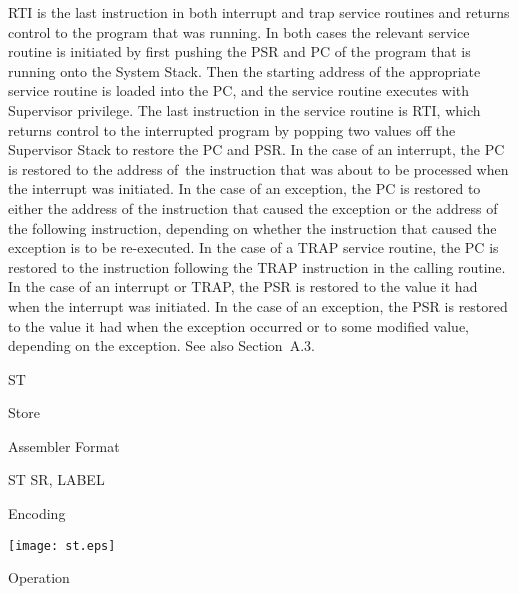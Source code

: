 \documentclass{patt}
\makeatletter
\renewcommand{\apphead}[2]{%
  \clearpage\vspace*{-8pt}
  \noindent\parbox[t]{21pc}{\raggedright\sans\fontsize{24}{28}\fontseries{bk}%
    \selectfont\MakeUppercase{#1}}\parbox[t]{7pc}{\sans\fontseries{bk}\fontsize{14}{28}\selectfont
    \raggedright #2}\@afterindentfalse\@afterheading\vspace*{-1pc}}
\renewcommand{\appbhead}[1]{%
  \goodbreak\vspace{6pt}
  \begingroup
  \noindent\raggedright{\sans\fontsize{12}{14}\fontseries{bk}\selectfont
  #1\par}\endgroup\medskip\@afterindentfalse\@afterheading}
\makeatother
\begin{document}
RTI is the last instruction in both interrupt and trap service 
routines and returns control to the program that was running.
In both cases the relevant service routine is initiated by first pushing
the PSR and PC of the program that is running onto the System Stack. Then
the starting address of the appropriate service routine is loaded into the
PC, and the service routine executes with Supervisor privilege. The last 
instruction in the service 
routine is RTI, which returns control to the interrupted program by 
popping two values off the Supervisor Stack to restore the PC and PSR. 
In the case of an interrupt, the PC is restored to the address of~the 
instruction that was about to be processed when the interrupt was initiated. 
In the case of an exception, the PC is restored to either the address of the
instruction that caused the exception or the address of the following
instruction, depending on whether the instruction that caused the
exception is to be re-executed. In the case of a TRAP service routine,
the PC is restored to the instruction following the TRAP instruction in
the calling routine.  In the case of an interrupt or TRAP, the PSR
is restored to the value it had when the interrupt was initiated. In
the case of an exception, the PSR is restored to the value it had when
the exception occurred or to some modified value, depending on the
exception.  See also Section~A.3.
 \egroup

%
\begingroup
  \makeatletter
 \pagestyle{empty}
 \makeatother


\apphead{St}{\vspace{-18pt}\hfill Store}

\bigskip

\vspace{4pt}

\appbhead{Assembler Format}

\begin{appverbatim}
ST    SR, LABEL
\end{appverbatim}

\vspace{4pt}

\appbhead{Encoding}

\texttt{[image: st.eps]}

\vspace{4pt}

\appbhead{Operation}
{}
\end{document}
